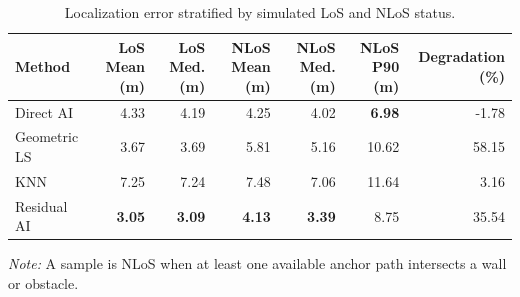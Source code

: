 \begin{table}[t]
\centering
\caption{Localization error stratified by simulated LoS and NLoS status.}
\label{tab:los_nlos}
\small
\begin{tabular}{lrrrrrr}
\toprule
Method & LoS Mean (m) & LoS Med. (m) & NLoS Mean (m) & NLoS Med. (m) & NLoS P90 (m) & Degradation (\%) \\
\midrule
Direct AI & 4.33 & 4.19 & 4.25 & 4.02 & \textbf{6.98} & -1.78 \\
Geometric LS & 3.67 & 3.69 & 5.81 & 5.16 & 10.62 & 58.15 \\
KNN & 7.25 & 7.24 & 7.48 & 7.06 & 11.64 & 3.16 \\
Residual AI & \textbf{3.05} & \textbf{3.09} & \textbf{4.13} & \textbf{3.39} & 8.75 & 35.54 \\
\bottomrule
\end{tabular}
\par\smallskip\footnotesize\textit{Note:} A sample is NLoS when at least one available anchor path intersects a wall or obstacle.
\end{table}
